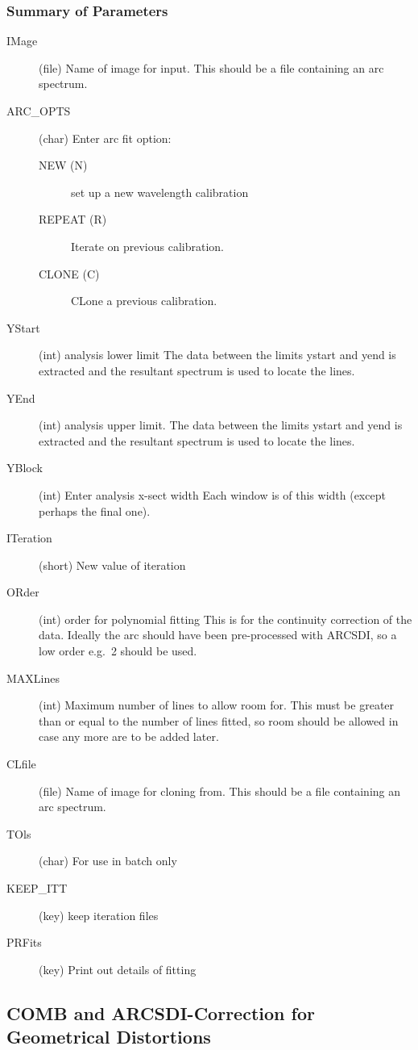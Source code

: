 \documentclass[11pt,twoside]{article}
\newcommand{\xlabel}[1]{}
\begin{document}
\subsubsection{\xlabel{summary_of_parameters}Summary of Parameters}

\begin{description}
\item[IMage] (file) Name of image for input. This should be a file
containing an arc spectrum.
\item[ARC\_OPTS] (char) Enter arc fit option:
\begin{description}
\item[NEW (N)] set up a new wavelength calibration
\item[REPEAT (R)] Iterate on previous calibration.
\item[CLONE (C)] CLone a previous calibration.
\end{description}
\item[YStart] (int) analysis lower limit The data between the
limits ystart and yend is extracted and the resultant spectrum is used
to locate the lines.
\item[YEnd] (int) analysis upper limit. The data between the
limits ystart and yend is extracted and the resultant spectrum is used
to locate the lines.
\item[YBlock] (int) Enter analysis x-sect width Each window is
of this width (except perhaps the final one).
\item[ITeration] (short) New value of iteration
\item[ORder] (int) order for polynomial fitting This is for the
continuity correction of the data. Ideally the arc should have been
pre-processed with ARCSDI, so a low order e.g.\ 2 should be used.
\item[MAXLines] (int) Maximum number of lines to allow room for.
This must be greater than or equal to the number of lines fitted, so
room should be allowed in case any more are to be added later.
\item[CLfile] (file) Name of image for cloning from. This should
be a file containing an arc spectrum.
\item[TOls] (char) For use in batch only
\item[KEEP\_ITT] (key) keep iteration files
\item[PRFits] (key) Print out details of fitting
\end{description}

\subsection{\xlabel{comb_and_arcsdicorrection_for_geometrical_distortions}%
COMB and ARCSDI-Correction for Geometrical Distortions}
\end{document}
